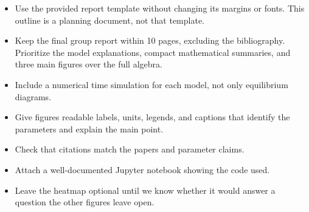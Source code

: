 \documentclass[11pt]{article}
\begin{document}
\begin{itemize}
    \item Use the provided report template without changing its margins or
    fonts. This outline is a planning document, not that template.
    \item Keep the final group report within 10 pages, excluding the
    bibliography. Prioritize the model explanations, compact mathematical
    summaries, and three main figures over the full algebra.
    \item Include a numerical time simulation for each model, not only
    equilibrium diagrams.
    \item Give figures readable labels, units, legends, and captions that
    identify the parameters and explain the main point.
    \item Check that citations match the papers and parameter claims.
    \item Attach a well-documented Jupyter notebook showing the code used.
    \item Leave the heatmap optional until we know whether it would answer
    a question the other figures leave open.
\end{itemize}
\end{document}
